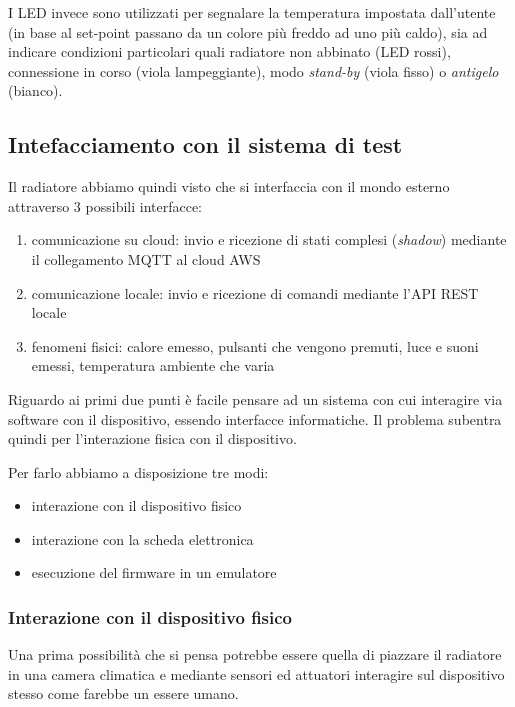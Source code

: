 \documentclass[a4paper,titlepage]{article}
\begin{document}
I LED invece sono utilizzati per segnalare la temperatura impostata dall'utente
(in base al set-point passano da un colore più freddo ad uno più caldo), sia ad
indicare condizioni particolari quali radiatore non abbinato (LED rossi), connessione
in corso (viola lampeggiante), modo \textit{stand-by} (viola fisso) o \textit{antigelo} (bianco).

\subsection{Intefacciamento con il sistema di test}

Il radiatore abbiamo quindi visto che si interfaccia con il mondo esterno attraverso
3 possibili interfacce:

\begin{enumerate}
    \item comunicazione su cloud: invio e ricezione di stati complesi (\textit{shadow})
        mediante il collegamento MQTT al cloud AWS
    \item comunicazione locale: invio e ricezione di comandi mediante l'API REST locale
    \item fenomeni fisici: calore emesso, pulsanti che vengono premuti, luce e suoni
        emessi, temperatura ambiente che varia
\end{enumerate}

Riguardo ai primi due punti è facile pensare ad un sistema con cui interagire via
software con il dispositivo, essendo interfacce informatiche. Il problema subentra quindi
per l'interazione fisica con il dispositivo.

Per farlo abbiamo a disposizione tre modi:
\begin{itemize}
    \item interazione con il dispositivo fisico
    \item interazione con la scheda elettronica
    \item esecuzione del firmware in un emulatore
\end{itemize}

\subsubsection{Interazione con il dispositivo fisico}

Una prima possibilità che si pensa potrebbe essere quella di piazzare il radiatore in una camera
climatica e mediante sensori ed attuatori interagire sul dispositivo stesso come farebbe
un essere umano.
\end{document}
